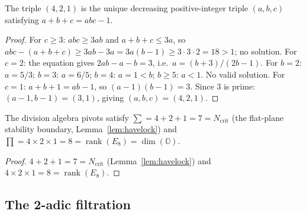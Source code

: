 \begin{theorem}\label{thm:pivot-unique}
The triple $(4,2,1)$ is the unique decreasing positive-integer triple
$(a,b,c)$ satisfying $a + b + c = abc - 1$.
\end{theorem}

\begin{proof}
For $c \geq 3$: $abc \geq 3ab$ and $a+b+c \leq 3a$, so
$abc - (a{+}b{+}c) \geq 3ab - 3a = 3a(b{-}1) \geq 3 \cdot 3 \cdot 2 = 18 > 1$;
no solution.
For $c = 2$: the equation gives $2ab - a - b = 3$, i.e.\
$a = (b{+}3)/(2b{-}1)$.  For $b = 2$: $a = 5/3$; $b = 3$: $a = 6/5$;
$b = 4$: $a = 1 < b$; $b \geq 5$: $a < 1$.  No valid solution.
For $c = 1$: $a + b + 1 = ab - 1$, so $(a-1)(b-1) = 3$.
Since $3$ is prime: $(a-1, b-1) = (3, 1)$, giving $(a,b,c) = (4,2,1)$.
\end{proof}

\begin{proposition}\label{prop:ncrit-rank}
The division algebra pivots satisfy
$\sum = 4 + 2 + 1 = 7 = N_{\mathrm{crit}}$ (the flat-plane stability
boundary, Lemma~\ref{lem:havelock}) and
$\prod = 4 \times 2 \times 1 = 8 = \operatorname{rank}(E_8) = \dim(\mathbb{O})$.
\end{proposition}

\begin{proof}
$4 + 2 + 1 = 7 = N_{\mathrm{crit}}$ (Lemma~\ref{lem:havelock})
and $4 \times 2 \times 1 = 8 = \operatorname{rank}(E_8)$.
\end{proof}

\subsection{The 2-adic filtration}
\label{sec:2adic}

